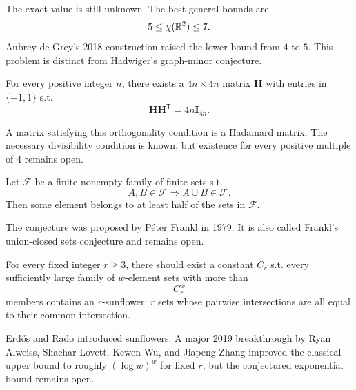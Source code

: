     \begin{remark}
        The exact value is still unknown. The best general bounds are
        \[
            5\leq \chi(\mathbb{R}^2)\leq 7.
        \]
        Aubrey de Grey's 2018 construction raised the lower bound from $4$ to
        $5$. This problem is distinct from Hadwiger's graph-minor conjecture.
    \end{remark}

    \begin{conjecture}
        For every positive integer $n$, there exists a $4n\times 4n$ matrix
        $\mathbf{H}$ with entries in $\{-1,1\}$ s.t.
        \[
            \mathbf{H}\mathbf{H}^{\mathsf T}
            =
            4n\mathbf{I}_{4n}.
        \]
    \end{conjecture}

    \begin{remark}
        A matrix satisfying this orthogonality condition is a Hadamard matrix.
        The necessary divisibility condition is known, but existence for every
        positive multiple of $4$ remains open.
    \end{remark}

    \begin{conjecture}
        Let $\mathcal{F}$ be a finite nonempty family of finite sets s.t.
        \[
            A,B\in\mathcal{F}
            \Rightarrow
            A\cup B\in\mathcal{F}.
        \]
        Then some element belongs to at least half of the sets in
        $\mathcal{F}$.
    \end{conjecture}

    \begin{remark}
        The conjecture was proposed by Péter Frankl in 1979. It is also called
        Frankl's union-closed sets conjecture and remains open.
    \end{remark}


    \begin{conjecture}
        For every fixed integer $r\geq 3$, there should exist a constant $C_r$
        s.t. every sufficiently large family of $w$-element sets with more than
        \[
            C_r^w
        \]
        members contains an $r$-sunflower: $r$ sets whose pairwise intersections
        are all equal to their common intersection.
    \end{conjecture}

    \begin{remark}
        Erd\H{o}s and Rado introduced sunflowers. A major 2019 breakthrough by
        Ryan Alweiss, Shachar Lovett, Kewen Wu, and Jiapeng Zhang improved the
        classical upper bound to roughly $(\log w)^w$ for fixed $r$, but the
        conjectured exponential bound remains open.
    \end{remark}

